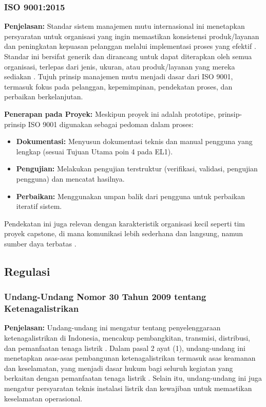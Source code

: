 \documentclass{elsinta}
\begin{document}
\subsubsection{ISO 9001:2015}

\textbf{Penjelasan:} Standar sistem manajemen mutu internasional ini menetapkan persyaratan untuk organisasi yang ingin memastikan konsistensi produk/layanan dan peningkatan kepuasan pelanggan melalui implementasi proses yang efektif \cite{iso9001_2015}. Standar ini bersifat generik dan dirancang untuk dapat diterapkan oleh semua organisasi, terlepas dari jenis, ukuran, atau produk/layanan yang mereka sediakan \cite{iso9001_sme}. Tujuh prinsip manajemen mutu menjadi dasar dari ISO 9001, termasuk fokus pada pelanggan, kepemimpinan, pendekatan proses, dan perbaikan berkelanjutan.

\textbf{Penerapan pada Proyek:} Meskipun proyek ini adalah prototipe, prinsip-prinsip ISO 9001 digunakan sebagai pedoman dalam proses:
\begin{itemize}
    \item \textbf{Dokumentasi:} Menyusun dokumentasi teknis dan manual pengguna yang lengkap (sesuai Tujuan Utama poin 4 pada EL1).
    \item \textbf{Pengujian:} Melakukan pengujian terstruktur (verifikasi, validasi, pengujian pengguna) dan mencatat hasilnya.
    \item \textbf{Perbaikan:} Menggunakan umpan balik dari pengguna untuk perbaikan iteratif sistem.
\end{itemize}
Pendekatan ini juga relevan dengan karakteristik organisasi kecil seperti tim proyek capstone, di mana komunikasi lebih sederhana dan langsung, namun sumber daya terbatas \cite{iso9001_sme}.

\subsection{Regulasi}


\subsubsection{Undang-Undang Nomor 30 Tahun 2009 tentang Ketenagalistrikan}

\textbf{Penjelasan:} Undang-undang ini mengatur tentang penyelenggaraan ketenagalistrikan di Indonesia, mencakup pembangkitan, transmisi, distribusi, dan pemanfaatan tenaga listrik \cite{uu30_2009}. Dalam pasal 2 ayat (1), undang-undang ini menetapkan asas-asas pembangunan ketenagalistrikan termasuk asas keamanan dan keselamatan, yang menjadi dasar hukum bagi seluruh kegiatan yang berkaitan dengan pemanfaatan tenaga listrik \cite{uu30_2009}. Selain itu, undang-undang ini juga mengatur persyaratan teknis instalasi listrik dan kewajiban untuk memastikan keselamatan operasional.
\end{document}
